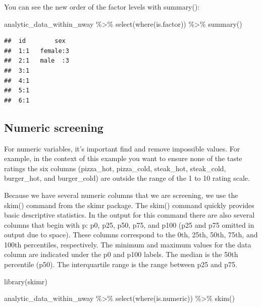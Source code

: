 \documentclass[
]{krantz}
\makeatletter
\newenvironment{Shaded}{\begin{snugshade}}{\end{snugshade}}
\newcommand{\FunctionTok}[1]{\textcolor[rgb]{0,0,0}{#1}}
\newcommand{\NormalTok}[1]{#1}
\newcommand{\SpecialCharTok}[1]{\textcolor[rgb]{0,0,0}{#1}}
\newenvironment{kframe}{%
\medskip{}
\setlength{\fboxsep}{.8em}
 \def\at@end@of@kframe{}%
 \ifinner\ifhmode%
  \def\at@end@of@kframe{\end{minipage}}%
  \begin{minipage}{\columnwidth}%
 \fi\fi%
 \def\FrameCommand##1{\hskip\@totalleftmargin \hskip-\fboxsep
 \colorbox{shadecolor}{##1}\hskip-\fboxsep
     \hskip-\linewidth \hskip-\@totalleftmargin \hskip\columnwidth}%
 \MakeFramed {\advance\hsize-\width
   \@totalleftmargin\z@ \linewidth\hsize
   \@setminipage}}%
 {\par\unskip\endMakeFramed%
 \at@end@of@kframe}
\renewenvironment{Shaded}{\begin{kframe}}{\end{kframe}}
\makeatother
\begin{document}
You can see the new order of the factor levels with summary():

\begin{Shaded}
\begin{Highlighting}[]
\NormalTok{analytic\_data\_within\_nway }\SpecialCharTok{\%\textgreater{}\%}
  \FunctionTok{select}\NormalTok{(}\FunctionTok{where}\NormalTok{(is.factor)) }\SpecialCharTok{\%\textgreater{}\%}
  \FunctionTok{summary}\NormalTok{()}
\end{Highlighting}
\end{Shaded}

\begin{verbatim}
##  id        sex   
##  1:1   female:3  
##  2:1   male  :3  
##  3:1             
##  4:1             
##  5:1             
##  6:1
\end{verbatim}

\hypertarget{numeric-screening-4}{%
\subsection{Numeric screening}\label{numeric-screening-4}}

For numeric variables, it's important find and remove impossible values. For example, in the context of this example you want to ensure none of the taste ratings the six columns (pizza\_hot, pizza\_cold, steak\_hot, steak\_cold, burger\_hot, and burger\_cold) are outside the range of the 1 to 10 rating scale.

Because we have several numeric columns that we are screening, we use the skim() command from the skimr package. The skim() command quickly provides basic descriptive statistics. In the output for this command there are also several columns that begin with p: p0, p25, p50, p75, and p100 (p25 and p75 omitted in output due to space). These columns correspond to the 0th, 25th, 50th, 75th, and 100th percentiles, respectively. The minimum and maximum values for the data column are indicated under the p0 and p100 labels. The median is the 50th percentile (p50). The interquartile range is the range between p25 and p75.

\begin{Shaded}
\begin{Highlighting}[]
\FunctionTok{library}\NormalTok{(skimr)}

\NormalTok{analytic\_data\_within\_nway }\SpecialCharTok{\%\textgreater{}\%}
  \FunctionTok{select}\NormalTok{(}\FunctionTok{where}\NormalTok{(is.numeric)) }\SpecialCharTok{\%\textgreater{}\%}
  \FunctionTok{skim}\NormalTok{()}
\end{Highlighting}
\end{Shaded}
\end{document}
